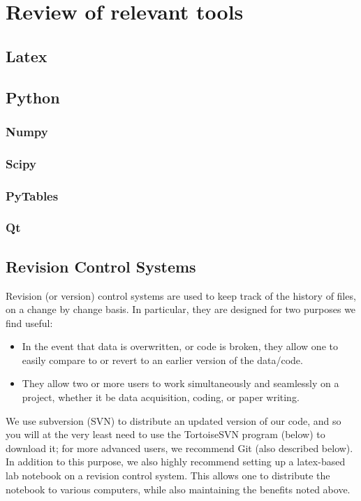 \section{Review of relevant tools}
\subsection{Latex}
\subsection{Python}
\subsubsection{Numpy}
\subsubsection{Scipy}
\subsubsection{PyTables}
\subsubsection{Qt}
\subsection{Revision Control Systems}
Revision (or version) control systems
    are used to keep track of the history of files,
    on a change by change basis.
In particular, they are designed for two purposes we find useful:
\begin{itemize}
    \item In the event that data is overwritten, or code is broken,
        they allow one to easily compare to or revert to an earlier
        version of the data/code.
    \item They allow two or more users to work simultaneously and seamlessly
        on a project, whether it be data acquisition, coding, or paper writing.
\end{itemize}
We use subversion (SVN) to distribute an updated version of our code,
    and so you will at the very least need
    to use the TortoiseSVN program (below)
    to download it;
    for more advanced users, we recommend Git (also described below).
In addition to this purpose,
    we also highly recommend
    setting up a latex-based lab notebook
    on a revision control system.
This allows one to distribute the notebook
    to various computers, while also maintaining the benefits noted above.
